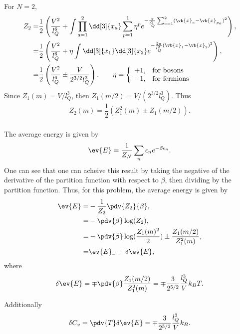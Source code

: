 \documentclass[a4paper,12pt,twoside]{article}
\begin{document}
\begin{multicols*}{2}
\subsubsection{}
For $N=2$,
\begin{align}
	Z_2 =& \frac{1}{2} \left( \frac{V^2}{l_Q^6} + \int \prod_{a=1}^2 \dd[3]{x_a} \sum_{p = 1}^1 \eta^p e^{-\frac{\pi}{l_Q^2}\sum_{a=1}^2 (\vb{x}_a-\vb{x}_{p_a})^2} \right),\\
	=& \frac{1}{2} \left( \frac{V^2}{l_Q^6} + \eta\int \dd[3]{x_1}\dd[3]{x_2} e^{-\frac{2\pi}{l_Q^2}(\vb{x}_1-\vb{x}_2)^2} \right),\\
	=& \frac{1}{2} \left( \frac{V^2}{l_Q^6} \pm \frac{V}{2^{3/2} l_Q^3} \right). \qquad \eta = \left\{
		\begin{array}{rl}
			+1, & \text{for bosons}\\
			-1, & \text{for fermions}\\
		\end{array}
	\right.
\end{align}
Since $Z_1(m) = V/l_Q^3$, then $Z_1(m/2) = V/(2^{3/2} l_Q^3)$.
Thus
\begin{equation}
	Z_2(m) = \frac{1}{2} \left(Z_1^2(m) \pm Z_1(m/2)\right).
\end{equation}
\subsubsection{}
The average energy is given by
\begin{equation}
	\ev{E} = \frac{1}{Z_N} \sum_n \epsilon_n e^{-\beta \epsilon_n}.
\end{equation}
One can see that one can acheive this result by taking the negative of the derivative of the partition function with respect to $\beta$, then dividing by the partition function.
Thus, for this problem, the average energy is given by
\begin{align}
	\ev{E} =& -\frac{1}{Z_2} \pdv{Z_2}{\beta},\\
	=& -\pdv{\beta} \log(Z_2),\\
	=& -\pdv{\beta} \log(\frac{Z_1(m)^2}{2}) \pm \frac{Z_1(m/2)}{Z_1^2(m)},\\
	=& \ev{E}_\sim + \delta\ev{E},
\end{align}
where
\begin{equation}
	\delta\ev{E} = \mp \pdv{\beta} \frac{Z_1(m/2)}{Z_1^2(m)} = \mp \frac{3}{2^{5/2}} \frac{l_Q^3}{V}k_B T.
\end{equation}

Additionally
\begin{equation}
	\delta C_v = \pdv{T}\delta\ev{E} = \mp \frac{3}{2^{5/2}} \frac{l_Q^3}{V}k_B.
\end{equation}


\end{multicols*}
\end{document}

